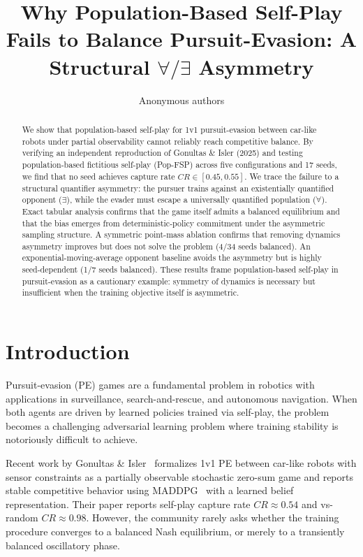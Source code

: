 \documentclass[letterpaper, 10pt, journal]{IEEEtran}
\title{Why Population-Based Self-Play Fails to Balance Pursuit-Evasion: A Structural $\forall/\exists$ Asymmetry}
\author{Anonymous authors}
\begin{document}
\maketitle

\begin{abstract}
We show that population-based self-play for 1v1 pursuit-evasion between car-like robots under partial observability cannot reliably reach competitive balance. By verifying an independent reproduction of Gonultas \& Isler (2025) and testing population-based fictitious self-play (Pop-FSP) across five configurations and 17 seeds, we find that no seed achieves capture rate $CR \in [0.45, 0.55]$. We trace the failure to a structural quantifier asymmetry: the pursuer trains against an existentially quantified opponent ($\exists$), while the evader must escape a universally quantified population ($\forall$). Exact tabular analysis confirms that the game itself admits a balanced equilibrium and that the bias emerges from deterministic-policy commitment under the asymmetric sampling structure. A symmetric point-mass ablation confirms that removing dynamics asymmetry improves but does not solve the problem (4/34 seeds balanced). An exponential-moving-average opponent baseline avoids the asymmetry but is highly seed-dependent (1/7 seeds balanced). These results frame population-based self-play in pursuit-evasion as a cautionary example: symmetry of dynamics is necessary but insufficient when the training objective itself is asymmetric.
\end{abstract}

\section{Introduction}
\label{sec:introduction}

Pursuit-evasion (PE) games are a fundamental problem in robotics with applications in surveillance, search-and-rescue, and autonomous navigation. When both agents are driven by learned policies trained via self-play, the problem becomes a challenging adversarial learning problem where training stability is notoriously difficult to achieve.

Recent work by Gonultas \& Isler~\cite{gonultas2024carlike} formalizes 1v1 PE between car-like robots with sensor constraints as a partially observable stochastic zero-sum game and reports stable competitive behavior using MADDPG~\cite{lowe2020multiagent} with a learned belief representation. Their paper reports self-play capture rate $CR \approx 0.54$ and vs-random $CR \approx 0.98$. However, the community rarely asks whether the training procedure converges to a balanced Nash equilibrium, or merely to a transiently balanced oscillatory phase.
\end{document}
